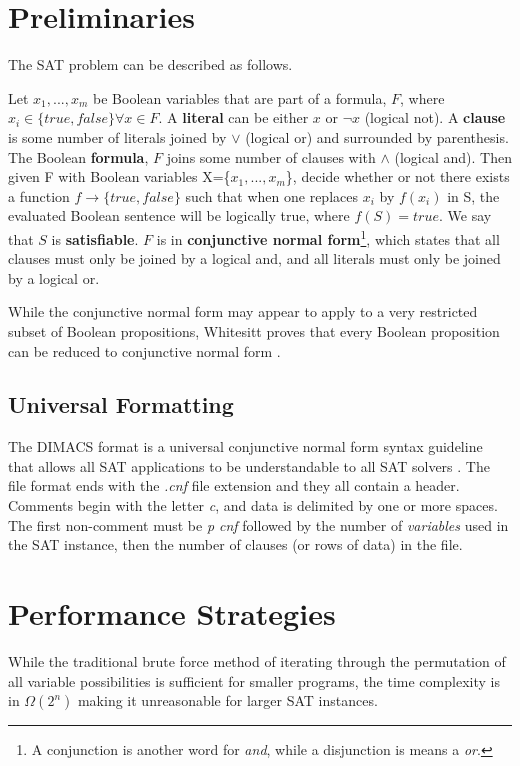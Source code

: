 \documentclass[runningheads]{llncs}
\begin{document}
\section{Preliminaries}
The SAT problem can be described as follows.

\begin{definition}
Let $x_1,...,x_m$ be Boolean variables that are part of a formula, $F$, where $x_i\in\{true, false\} \forall x\in F$. A \textbf{literal} can be either $x$ or $\neg x$ (logical not). A \textbf{clause} is some number of literals joined by $\lor$ (logical or) and surrounded by parenthesis. The Boolean \textbf{formula}, $F$ joins some number of clauses with $\land$ (logical and). Then given F with Boolean variables X=\{$x_1,...,x_m$\}, decide whether or not there exists a function $f\to\{true, false\}$ such that when one replaces $x_i$ by $f(x_i)$ in S, the evaluated Boolean sentence will be logically true, where $f(S)=true$. We say that $S$ is \textbf{satisfiable}. $F$ is in \textbf{conjunctive normal form}\footnote{A conjunction is another word for \emph{and}, while a disjunction is means a \emph{or}.}, which states that all clauses must only be joined by a logical and, and all literals must only be joined by a logical or.
\label{def:SAT}
\end{definition}

While the conjunctive normal form may appear to apply to a very restricted subset of Boolean propositions, Whitesitt proves that every Boolean proposition can be reduced to conjunctive normal form \cite{whitesitt2012boolean}.

\subsection{Universal Formatting}
\label{sec:dimacs}
The DIMACS format is a universal conjunctive normal form syntax guideline that allows all SAT applications to be understandable to all SAT solvers \cite{challenge1993satisfiability}. The file format ends with the \emph{.cnf} file extension and they all contain a header. Comments begin with the letter \emph{c}, and data is delimited by one or more spaces. The first non-comment must be \emph{p cnf} followed by the number of \emph{variables} used in the SAT instance, then the number of clauses (or rows of data) in the file.


\section{Performance Strategies}
While the traditional brute force method of iterating through the permutation of all variable possibilities is sufficient for smaller programs, the time complexity is in $\Omega(2^n)$ making it unreasonable for larger SAT instances.
\end{document}
